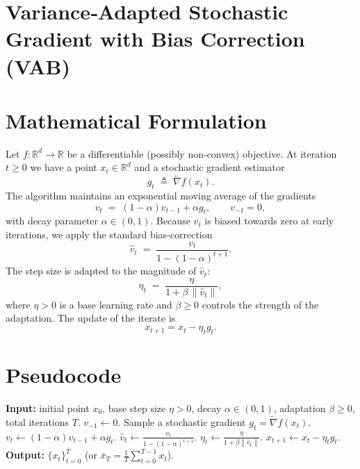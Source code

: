 \documentclass{article}
\newcommand{\RR}{\mathbb{R}}
\newcommand{\norm}[1]{\left\|#1\right\|}
\begin{document}
\section*{Variance‑Adapted Stochastic Gradient with Bias Correction (VAB)}

\section*{Mathematical Formulation}
Let $f:\RR^{d}\to\RR$ be a differentiable (possibly non‑convex) objective.  
At iteration $t\ge 0$ we have a point $x_t\in\RR^{d}$ and a stochastic gradient estimator 
\[
g_t \;\triangleq\; \widetilde{\nabla} f(x_t) .
\]
The algorithm maintains an exponential moving average of the gradients
\[
v_t \;=\;(1-\alpha)v_{t-1}+ \alpha g_t ,\qquad v_{-1}=0,
\tag{1}
\]
with decay parameter $\alpha\in(0,1)$.  
Because $v_t$ is biased towards zero at early iterations, we apply the standard bias‑correction
\[
\hat v_t \;=\;\frac{v_t}{1-(1-\alpha)^{t+1}} .
\tag{2}
\]
The step size is adapted to the magnitude of $\hat v_t$:
\[
\eta_t \;=\;\frac{\eta}{1+\beta \,\norm{\hat v_t}} ,
\tag{3}
\]
where $\eta>0$ is a base learning rate and $\beta\ge 0$ controls the strength of the adaptation.  
The update of the iterate is
\[
x_{t+1}=x_t-\eta_t g_t .
\tag{4}
\]

\section*{Pseudocode}
\begin{algorithm}[H]
\caption{Variance‑Adapted Stochastic Gradient with Bias Correction (VAB)}
\begin{algorithmic}[1]
\STATE \textbf{Input:} initial point $x_0$, base step size $\eta>0$, decay $\alpha\in(0,1)$, adaptation $\beta\ge0$, total iterations $T$.
\STATE $v_{-1}\gets 0$.
    \STATE Sample a stochastic gradient $g_t=\widetilde{\nabla}f(x_t)$.
    \STATE $v_t\gets (1-\alpha)v_{t-1}+ \alpha g_t$. \hfill{}
    \STATE $\displaystyle \hat v_t\gets \frac{v_t}{1-(1-\alpha)^{t+1}}$. \hfill{}
    \STATE $\displaystyle \eta_t\gets \frac{\eta}{1+\beta \norm{\hat v_t}}$. \hfill{}
    \STATE $x_{t+1}\gets x_t-\eta_t g_t$.
\ENDFOR
\STATE \textbf{Output:} $\{x_t\}_{t=0}^{T}$ (or $\bar x_T=\frac1T\sum_{t=0}^{T-1}x_t$).
\end{algorithmic}
\end{algorithm}
\end{document}
